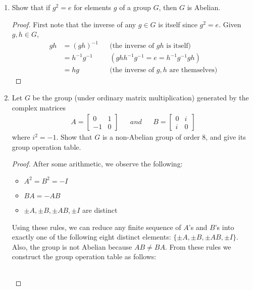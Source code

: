 \documentclass{article}
\begin{document}
\begin{enumerate}
  \item Show that if $g^2=e$ for elements $g$ of a group $G$, then $G$ is
    Abelian.
    \begin{proof}
      First note that the inverse of any $g\in G$ is itself since $g^2=e$.
      Given $g,h\in G$,
      \begin{align*}
        gh  & = (gh)^{-1}     && \text{(the inverse of $gh$ is itself)} \\
            & = h^{-1}g^{-1}  && (ghh^{-1}g^{-1}=e=h^{-1}g^{-1}gh) \\
            & = hg            && \text{(the inverse of $g,h$ are themselves)}
      \end{align*}
    \end{proof}

  \item Let $G$ be the group (under ordinary matrix multiplication)
    generated by the complex matrices \label{part_3}
    \begin{align*}
      A =
        \begin{bmatrix}
          0   & 1 \\
          -1  & 0
        \end{bmatrix}
        && and &&
      B =
        \begin{bmatrix}
          0   & i \\
          i   & 0
        \end{bmatrix}
    \end{align*}
    where $i^2=-1$. Show that $G$ is a non-Abelian group of order 8, and
    give its group operation table.
    \begin{proof}
      After some arithmetic, we observe the following:
      \begin{itemize}
        \item $A^2=B^2=-I$
        \item $BA=-AB$
        \item $\pm A, \pm B, \pm AB, \pm I$ are distinct 
      \end{itemize}
      Using these rules, we can reduce any finite sequence of $A$'s and
      $B$'s into exactly one of the following eight distinct elements:
      $\{\pm A, \pm B, \pm AB, \pm I\}$. Also, the group is not Abelian
      because $AB\neq BA$. From these rules we construct the group
      operation table as follows: \\
      \begin{center}
        \begin{tabular}{|r||r|r|r|r|r|r|r|r|}

\end{tabular}
\end{center}
\end{proof}
\end{enumerate}
\end{document}
